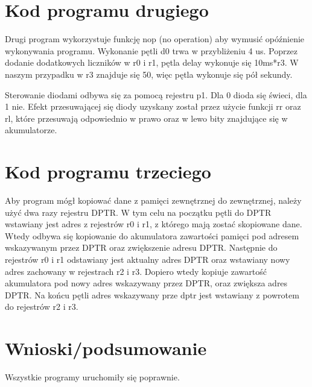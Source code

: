 \documentclass[12pt,a4paper]{article}
\begin{document}
	\section{Kod programu drugiego}
	\begin{minipage}{.5\textwidth}
		
	\end{minipage}%
	\begin{minipage}{.5\textwidth}
		Drugi program wykorzystuje funkcję nop (no operation) aby wymusić opóźnienie wykonywania programu. Wykonanie pętli d0 trwa w przybliżeniu 4 us. Poprzez dodanie dodatkowych liczników w r0 i r1, pętla delay wykonuje się 10ms*r3.
		W naszym przypadku w r3 znajduje się 50, więc pętla wykonuje się pół sekundy.
		
		Sterowanie diodami odbywa się za pomocą rejestru p1. Dla 0 dioda się świeci, dla 1 nie. Efekt przesuwającej się diody uzyskany został przez użycie funkcji rr oraz rl, które przesuwają odpowiednio w prawo oraz w lewo bity znajdujące się w akumulatorze.
	\end{minipage}

	\section{Kod programu trzeciego}
	\begin{minipage}{.5\textwidth}
		
	\end{minipage}%
	\begin{minipage}{.5\textwidth}
		Aby program mógł kopiować dane z pamięci zewnętrznej do zewnętrznej, należy użyć dwa razy rejestru DPTR. W tym celu na początku pętli do DPTR wstawiany jest adres z rejestrów r0 i r1, z którego mają zostać skopiowane dane. Wtedy odbywa się kopiowanie do akumulatora zawartości pamięci pod adresem wskazywanym przez DPTR oraz zwiększenie adresu DPTR. Następnie do rejestrów r0 i r1 odstawiany jest aktualny adres DPTR oraz wstawiany nowy adres zachowany w rejestrach r2 i r3. Dopiero wtedy kopiuje zawartość akumulatora pod nowy adres wskazywany przez DPTR, oraz zwiększa adres DPTR. Na końcu pętli adres wskazywany prze dptr jest wstawiany z powrotem do rejestrów r2 i r3.
	\end{minipage}

	\section{Wnioski/podsumowanie}
	
			Wszystkie programy uruchomiły się poprawnie.
	
\end{document}
